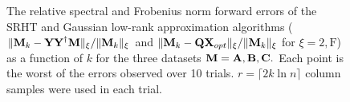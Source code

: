 \begin{figure}[htp]
 \caption{The relative spectral and Frobenius norm forward errors of the SRHT and Gaussian low-rank approximation algorithms
 ($\mbox{}\|{\bm{\mathrm{M}}}_k - {\bm{\mathrm{Y}}}{{\bm{\mathrm{Y}}}}^\dagger {\ensuremath{\bm{\mathrm{M}}}}\|_{\xi}/\mbox{}\|{\bm{\mathrm{M}}}_k\|_{\xi}$ and $\mbox{}\|{\bm{\mathrm{M}}}_k - {\bm{\mathrm{Q}}} {\bm{\mathrm{X}}}_{opt}\|_{\xi}/\mbox{}\|{\bm{\mathrm{M}}}_k\|_{\xi}$ for $\xi = 2, \mathrm{F}$)
 as a function of $k$ for the three datasets ${\bm{\mathrm{M}}} = {\bm{\mathrm{A}}}, {\bm{\mathrm{B}}}, {\bm{\mathrm{C}}}.$ Each point is the worst of the errors observed over 10 trials. $r = \lceil 2 k \ln n \rceil$ column samples were used in each trial.}
 \label{fig:forwarderrors}
\end{figure}

